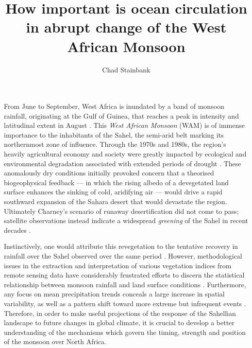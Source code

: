 \documentclass[a4paper]{article}
\begin{document}
\title{How important is ocean circulation in abrupt change of the West African Monsoon}
\author{Chad Stainbank}
\maketitle

From June to September, West Africa is inundated by a band of monsoon rainfall, originating at the Gulf of Guinea, that reaches a peak in intensity and latitudinal extent in August \parencite{sultan2003west}.
This \emph{West African Monsoon} (WAM) is of immense importance to the inhabitants of the Sahel, the semi-arid belt marking its northernmost zone of influence.
Through the 1970s and 1980s, the region's heavily agricultural economy and society were greatly impacted by ecological and environmental degradation associated with extended periods of drought \parencite{benson1998impact, olsson1993causes, walther2016review}.
These anomalously dry conditions initially provoked concern that a theorised biogeophysical feedback --- in which the rising albedo of a devegetated land surface enhances the sinking of cold, aridifying air \parencite{charney1975dynamics, charney1975drought} --- would drive a rapid southward expansion of the Sahara desert that would devastate the region.
Ultimately Charney's scenario of runaway desertification did not come to pass; satellite observations instead indicate a widespread \emph{greening} of the Sahel in recent decades \parencite{olsson2005recent, dardel2014re}.

Instinctively, one would attribute this revegetation to the tentative recovery in rainfall over the Sahel observed over the same period \parencite{lebel2009recent}.
However, methodological issues in the extraction and interpretation of various vegetation indices from remote sensing data have considerably frustrated efforts to discern the statistical relationship between monsoon rainfall and land surface conditions \parencite{fensholt2013assessing, dardel2014rain}.
Furthermore, any focus on mean precipitation trends conceals a large increase in spatial variability, as well as a pattern shift toward more extreme but infrequent events \parencite{nicholson2013west, panthou2014recent}.
Therefore, in order to make useful projections of the response of the Sahellian landscape to future changes in global climate, it is crucial to develop a better understanding of the mechanisms which govern the timing, strength and position of the monsoon over North Africa. 
\end{document}
